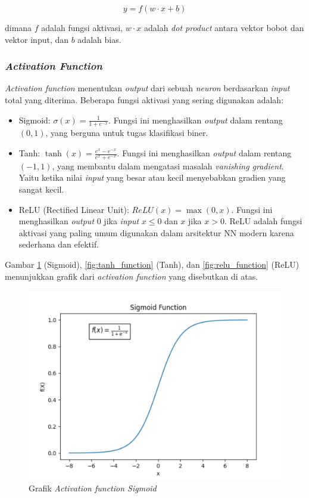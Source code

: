 \begin{equation}
  \label{eq:perceptron}
  y = f(w \cdot x + b)
\end{equation}

dimana \( f \) adalah fungsi aktivasi, \( w \cdot x \) adalah \emph{dot product} antara vektor bobot dan vektor input, dan \( b \) adalah bias.
 
 \subsubsection{\emph{Activation Function}}
 \emph{Activation function} menentukan \emph{output} dari sebuah \emph{neuron} berdasarkan \emph{input} total yang diterima. Beberapa fungsi aktivasi yang sering digunakan adalah:
 \begin{itemize}[nolistsep]
   \item Sigmoid: \( \sigma(x) = \frac{1}{1 + e^{-x}} \). Fungsi ini menghasilkan \emph{output} dalam rentang \( (0, 1) \), yang berguna untuk tugas klasifikasi biner.
   \item Tanh: \( \tanh(x) = \frac{e^{x} - e^{-x}}{e^{x} + e^{-x}} \). Fungsi ini menghasilkan \emph{output} dalam rentang \( (-1, 1) \), yang membantu dalam mengatasi masalah \emph{vanishing gradient}. Yaitu ketika nilai \emph{input} yang besar atau kecil menyebabkan gradien yang sangat kecil.
   \item ReLU (Rectified Linear Unit): \( ReLU(x) = \max(0, x) \). Fungsi ini menghasilkan \emph{output} \( 0 \) jika \emph{input} \( x \leq 0 \) dan \( x \) jika \( x > 0 \). ReLU adalah fungsi aktivasi yang paling umum digunakan dalam arsitektur NN modern karena sederhana dan efektif.
 \end{itemize}

  Gambar \ref{fig:sigmoid_function} (Sigmoid), \ref{fig:tanh_function} (Tanh), dan \ref{fig:relu_function} (ReLU) menunjukkan grafik dari \emph{activation function} yang disebutkan di atas.

  \begin{figure}[htbp]
    \centering
    \includegraphics[scale=0.6]{gambar/bab2-grafik-sigmoid.png}
  \caption{Grafik \emph{Activation function Sigmoid}}
  \label{fig:sigmoid_function}
  \end{figure}

